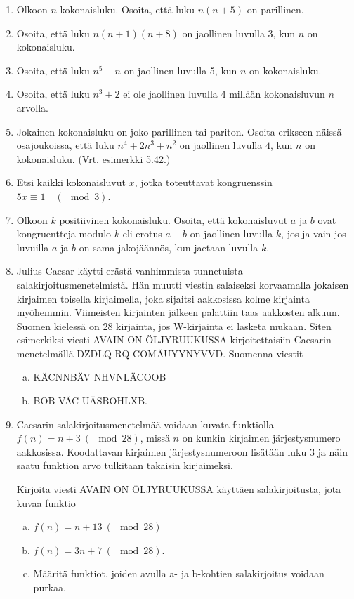 \begin{enumerate}
\item Olkoon $n$ kokonaisluku. Osoita, että luku $n(n + 5)$ on parillinen.

\item Osoita, että luku $n(n + 1)(n + 8)$ on jaollinen luvulla 3, kun $n$ on kokonaisluku.

\item Osoita, että luku $n^5 - n$ on jaollinen luvulla 5, kun $n$ on kokonaisluku.

\item Osoita, että luku $n^3 + 2$ ei ole jaollinen luvulla 4 millään kokonaisluvun $n$ arvolla.

\newpage
\item Jokainen kokonaisluku on joko parillinen tai pariton. Osoita erikseen näissä osajoukoissa, että luku $n^4 + 2n^3 + n^2$ on jaollinen luvulla $4$, kun $n$ on kokonaisluku. (Vrt. esimerkki 5.42.)

\item
Etsi kaikki kokonaisluvut $x$, jotka toteuttavat kongruenssin $5x\equiv 1 \quad (\mod 3)$.

\item
Olkoon $k$ positiivinen kokonaisluku. Osoita, että kokonaisluvut $a$ ja $b$ ovat kongruentteja modulo $k$ eli erotus $a-b$ on jaollinen luvulla $k$, jos ja vain jos luvuilla $a$ ja $b$ on sama jakojäännös, kun jaetaan luvulla $k$.

\item Julius Caesar käytti erästä vanhimmista tunnetuista salakirjoitusmenetelmistä. Hän muutti viestin salaiseksi korvaamalla jokaisen kirjaimen toisella kirjaimella, joka sijaitsi aakkosissa kolme kirjainta myöhemmin. Viimeisten kirjainten jälkeen palattiin taas aakkosten alkuun. Suomen kielessä on 28 kirjainta, jos W-kirjainta ei lasketa mukaan. Siten esimerkiksi viesti AVAIN ON ÖLJYRUUKUSSA kirjoitettaisiin Caesarin menetelmällä DZDLQ RQ COMÄUYYNYVVD. Suomenna viestit 
\begin{enumerate}[a)]
\item KÄCNNBÄV NHVNLÄCOOB
\item BOB VÄC UÄSBOHLXB.
\end{enumerate}

\item Caesarin salakirjoitusmenetelmää voidaan kuvata funktiolla $f(n) = n + 3 \ (\mod 28)$, missä $n$ on kunkin kirjaimen järjestysnumero aakkosissa. Koodattavan kirjaimen järjestysnumeroon lisätään luku $3$ ja näin saatu funktion arvo tulkitaan takaisin kirjaimeksi. 

Kirjoita viesti AVAIN ON ÖLJYRUUKUSSA käyttäen salakirjoitusta, jota kuvaa funktio 
\begin{enumerate}[a)]
\item $f(n) = n + 13 \ (\mod 28)$
\item $f(n) = 3n + 7 \ (\mod 28)$.
\item Määritä funktiot, joiden avulla a- ja b-kohtien salakirjoitus voidaan purkaa.
\end{enumerate}

\end{enumerate}

